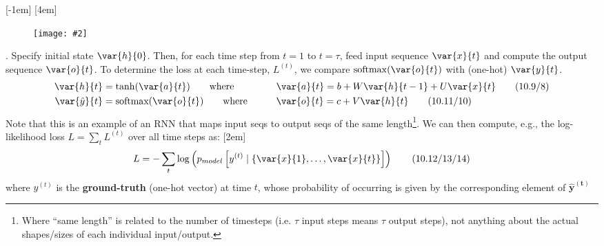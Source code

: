 \documentclass[11pt]{article}
\newcommand\myfig[2][0.3\textwidth]{\begin{figure}[h!]\centering\texttt{[image: \#2]}\end{figure}}
\newcommand\myspace[1][]{\vspace{#1\bigskipamount}}
\newcommand\p{\Needspace{10\baselineskip} \noindent}
\newcommand\tlab[1]{\tag{#1}\label{#1}}
\begin{document}
\myspace
{}[-1em]
[4em]
\myfig[0.4\textwidth]{RNN_Unrolled.PNG}


\myspace
\p {}. Specify initial state $\var{h}{0}$. Then, for each time step from $t=1$ to $t=\tau$, feed input sequence $\var{x}{t}$ and compute the output sequence $\var{o}{t}$. To determine the loss at each time-step, $L^{(t)}$, we compare $\mathrm{softmax}(\var{o}{t})$ with (one-hot) $\var{y}{t}$. 
\begin{alignat}{2}
	\var{h}{t} &= \tanh(\var{a}{t}) \qquad\text{where}\qquad &&\var{a}{t} = b + W\var{h}{t-1} + U\var{x}{t} \tlab{10.9/8}\\
	\var{\hat y}{t} &= \textrm{softmax}(\var{o}{t}) \qquad\text{where}\qquad &&\var{o}{t} = c + V \var{h}{t} \tlab{10.11/10}
\end{alignat}
Note that this is an example of an RNN that maps input seqs to output seqs of the same length\footnote{Where ``same length'' is related to the number of timesteps (i.e. $\tau$ input steps means $\tau$ output steps), not anything about the actual shapes/sizes of each individual input/output.}. We can then compute, e.g., the log-likelihood loss $L = \sum_t L^{(t)}$ over all time steps as:
[2em]
\begin{align}
L =- \sum_t \log\left( p_{model}\left[ y^{(t)}\mid \{\var{x}{1}, \ldots, \var{x}{t}\} \right]\right) \tlab{10.12/13/14}
\end{align}
where $y^{(t)}$ is the \textbf{ground-truth} (one-hot vector) at time $t$, whose probability of occurring is given by the corresponding element of $\bm{\hat y^{(t)}}$
\end{document}
